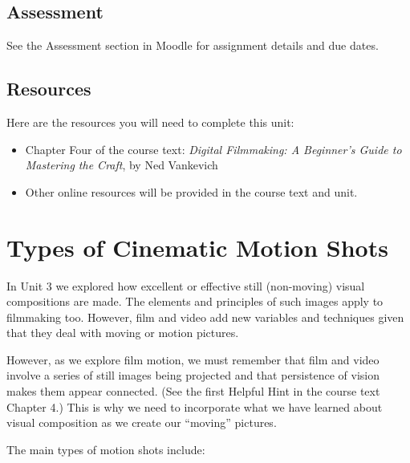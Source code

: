 \documentclass[
]{book}
\providecommand{\tightlist}{%
  \setlength{\itemsep}{0pt}\setlength{\parskip}{0pt}}
\begin{document}
\hypertarget{assessment-6}{%
\subsection*{Assessment}\label{assessment-6}}

See the Assessment section in Moodle for assignment details and due dates.

\hypertarget{resources-3}{%
\subsection*{Resources}\label{resources-3}}

Here are the resources you will need to complete this unit:

\begin{itemize}
\tightlist
\item
  Chapter Four of the course text: \emph{Digital Filmmaking: A Beginner's Guide to Mastering the Craft}, by Ned Vankevich
\item
  Other online resources will be provided in the course text and unit.
\end{itemize}

\hypertarget{types-of-cinematic-motion-shots}{%
\section{Types of Cinematic Motion Shots}\label{types-of-cinematic-motion-shots}}

In Unit 3 we explored how excellent or effective still (non-moving) visual compositions are made. The elements and principles of such images apply to filmmaking too. However, film and video add new variables and techniques given that they deal with moving or motion pictures.

However, as we explore film motion, we must remember that film and video involve a series of still images being projected and that persistence of vision makes them appear connected. (See the first Helpful Hint in the course text Chapter 4.) This is why we need to incorporate what we have learned about visual composition as we create our ``moving'' pictures.

The main types of motion shots include:
\end{document}

